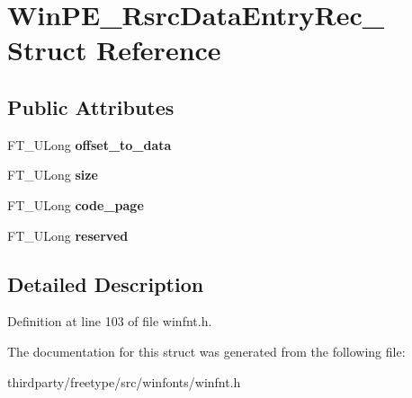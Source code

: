 \hypertarget{struct_win_p_e___rsrc_data_entry_rec__}{}\section{Win\+P\+E\+\_\+\+Rsrc\+Data\+Entry\+Rec\+\_\+ Struct Reference}
\label{struct_win_p_e___rsrc_data_entry_rec__}
\subsection*{Public Attributes}
\begin{DoxyCompactItemize}
\item 
\mbox{\label{struct_win_p_e___rsrc_data_entry_rec___ae6d388df33d62ceaeae061aa164e5312}} 
F\+T\+\_\+\+U\+Long {\bfseries offset\+\_\+to\+\_\+data}
\item 
\mbox{\label{struct_win_p_e___rsrc_data_entry_rec___a091e92b79926438c44f868e1dbe69c32}} 
F\+T\+\_\+\+U\+Long {\bfseries size}
\item 
\mbox{\label{struct_win_p_e___rsrc_data_entry_rec___a09db0df062bc15f6e986c4c6a4367efd}} 
F\+T\+\_\+\+U\+Long {\bfseries code\+\_\+page}
\item 
\mbox{\label{struct_win_p_e___rsrc_data_entry_rec___ae8edd0f39e1e107052bd4fc876ea4a85}} 
F\+T\+\_\+\+U\+Long {\bfseries reserved}
\end{DoxyCompactItemize}


\subsection{Detailed Description}


Definition at line 103 of file winfnt.\+h.



The documentation for this struct was generated from the following file\+:\begin{DoxyCompactItemize}
\item 
thirdparty/freetype/src/winfonts/winfnt.\+h\end{DoxyCompactItemize}
